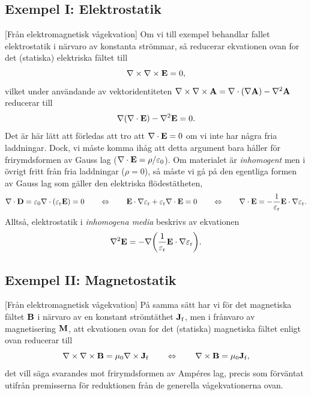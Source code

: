 \subsection{Exempel I: Elektrostatik}
[Fr{\aa}n elektromagnetisk v{\aa}gekvation]
Om vi till exempel behandlar fallet elektrostatik i n{\"a}rvaro av konstanta
str{\"o}mmar, s{\aa} reducerar ekvationen ovan for det (statiska) elektriska
f{\"a}ltet till
$$
  \nabla\times\nabla\times{\bf E}=0,
$$
vilket under anv{\"a}ndande av vektoridentiteten
$\nabla\times\nabla\times{\bf A}=\nabla\cdot(\nabla{\bf A})-\nabla^2{\bf A}$
reducerar till
$$
  \nabla(\nabla\cdot{\bf E})-\nabla^2{\bf E}=0.
$$
Det {\"a}r h{\"a}r l{\"a}tt att f{\"o}rledas att tro att $\nabla\cdot{\bf E}=0$
om vi inte har n{\aa}gra fria laddningar. Dock, vi m{\aa}ste komma ih{\aa}g att
detta argument bara h{\aa}ller f{\"o}r frirymdsformen av Gauss lag
($\nabla\cdot{\bf E}=\rho/\varepsilon_0$). Om materialet {\"a}r {\it inhomogent}
men i {\"o}vrigt fritt fr{\aa}n fria laddningar ($\rho=0$), s{\aa} m{\aa}ste vi
g{\aa} p{\aa} den egentliga formen av Gauss lag som g{\"a}ller den elektriska
fl{\"o}dest{\"a}theten,
$$
  \nabla\cdot{\bf D}
    =\varepsilon_0\nabla\cdot(\varepsilon_{\rm r}{\bf E})=0
  \qquad\Leftrightarrow\qquad
  {\bf E}\cdot\nabla\varepsilon_{\rm r}+
    \varepsilon_{\rm r}\nabla\cdot{\bf E}=0
  \qquad\Leftrightarrow\qquad
  \nabla\cdot{\bf E}=
    -{{1}\over{\varepsilon_{\rm r}}}{\bf E}\cdot\nabla\varepsilon_{\rm r}.
$$
Allts{\aa}, elektrostatik i {\it inhomogena media} beskrivs av ekvationen
$$
  \nabla^2{\bf E}=-\nabla\bigg(
      {{1}\over{\varepsilon_{\rm r}}}{\bf E}\cdot\nabla\varepsilon_{\rm r}
    \bigg).
$$

\subsection{Exempel II: Magnetostatik}
[Fr{\aa}n elektromagnetisk v{\aa}gekvation]
P{\aa} samma s{\"a}tt har vi f{\"o}r det magnetiska f{\"a}ltet ${\bf B}$ i
n{\"a}rvaro av en konstant str{\"o}mt{\"a}thet ${\bf J}_{\rm f}$, men i
fr{\aa}nvaro av magnetisering ${\bf M}$, att ekvationen ovan for det (statiska)
magnetiska f{\"a}ltet enligt ovan reducerar till
$$
  \nabla\times\nabla\times{\bf B}=\mu_0\nabla\times{\bf J}_{\rm f}
  \qquad\Leftrightarrow\qquad
  \nabla\times{\bf B}=\mu_0{\bf J}_{\rm f},
$$
det vill s{\"a}ga svarandes mot frirymdsformen av Amp\'eres lag, precis som
f{\"o}rv{\"a}ntat utifr{\aa}n premisserna f{\"o}r reduktionen fr{\aa}n de
generella v{\aa}gekvationerna ovan.
\vfill\eject

